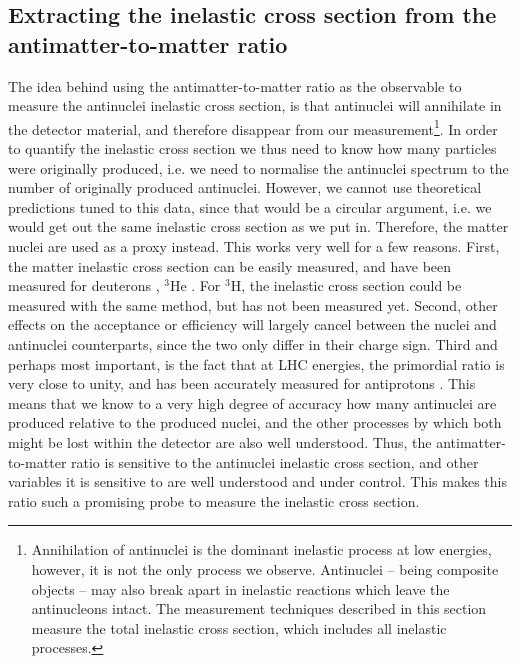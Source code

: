 \subsection{Extracting the inelastic cross section from the antimatter-to-matter ratio}
The idea behind using the antimatter-to-matter ratio as the observable to measure the antinuclei inelastic cross section, is that antinuclei will annihilate in the detector material, and therefore disappear from our measurement\footnote{Annihilation of antinuclei is the dominant inelastic process at low energies, however, it is not the only process we observe. Antinuclei -- being composite objects -- may also break apart in inelastic reactions which leave the antinucleons intact. The measurement techniques described in this section measure the total inelastic cross section, which includes all inelastic processes.}. In order to quantify the inelastic cross section we thus need to know how many particles were originally produced, i.e. we need to normalise the antinuclei spectrum to the number of originally produced antinuclei. However, we cannot use theoretical predictions tuned to this data, since that would be a circular argument, i.e. we would get out the same inelastic cross section as we put in. Therefore, the matter nuclei are used as a proxy instead. This works very well for a few reasons. First, the matter inelastic cross section can be easily measured, and have been measured for deuterons \cite{deuteron_cross_section}, $^3\mathrm{He}$ \cite{chargeradius_helium}. For $^3\mathrm{H}$, the inelastic cross section could be measured with the same method, but has not been measured yet. Second, other effects on the  acceptance or efficiency will largely cancel between the nuclei and antinuclei counterparts, since the two only differ in their charge sign. Third and perhaps most important, is the fact that at LHC energies, the primordial ratio is very close to unity, and has been accurately measured for antiprotons \cite{Abbas_2013_primordial_ratio}. This means that we know to a very high degree of accuracy how many antinuclei are produced relative to the produced nuclei, and the other processes by which both might be lost within the detector are also well understood. Thus, the antimatter-to-matter ratio is sensitive to the antinuclei inelastic cross section, and other variables it is sensitive to are well understood and under control. This makes this ratio such a promising probe to measure the inelastic cross section.\\

